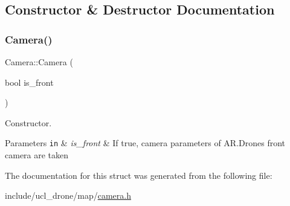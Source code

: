 \subsection{Constructor \& Destructor Documentation}
\mbox{\label{structCamera_affd4ef0866e8ac1e8da35ad09e5f6256}} 
\subsubsection{\texorpdfstring{Camera()}{Camera()}}
{\footnotesize\ttfamily Camera\+::\+Camera (\begin{DoxyParamCaption}\item[{bool}]{is\+\_\+front }\end{DoxyParamCaption})}



Constructor. 


\begin{DoxyParams}[1]{Parameters}
\mbox{\tt in}  & {\em is\+\_\+front} & If true, camera parameters of A\+R.\+Drone\textquotesingle{}s front camera are taken \\
\hline
\end{DoxyParams}


The documentation for this struct was generated from the following file\+:\begin{DoxyCompactItemize}
\item 
include/ucl\+\_\+drone/map/\hyperlink{camera_8h}{camera.\+h}\end{DoxyCompactItemize}
